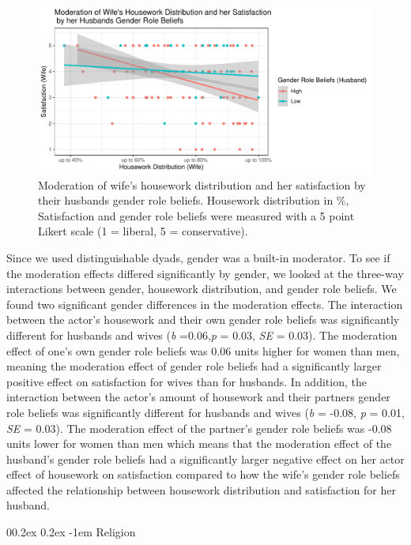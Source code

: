 \documentclass[
  man,floatsintext]{apa6}
\makeatletter
\let\oldparagraph\paragraph
\renewcommand{\paragraph}[1]{\oldparagraph{#1}\mbox{}}
\renewcommand{\paragraph}{\@startsection{paragraph}{4}{\parindent}%
  {0\baselineskip \@plus 0.2ex \@minus 0.2ex}%
  {-1em}%
  {\normalfont\normalsize\bfseries\itshape\typesectitle}}
\makeatother
\begin{document}
\begin{figure}
\centering
\includegraphics{Final_Paper_files/figure-latex/unnamed-chunk-58-1.pdf}
\caption{\label{fig:unnamed-chunk-58}Moderation of wife's housework distribution and her satisfaction by their husbands gender role beliefs. Housework distribution in \%, Satisfaction and gender role beliefs were measured with a 5 point Likert scale (1 = liberal, 5 = conservative).}
\end{figure}

Since we used distinguishable dyads, gender was a built-in moderator. To see if the moderation effects differed significantly by gender, we looked at the three-way interactions between gender, housework distribution, and gender role beliefs. We found two significant gender differences in the moderation effects. The interaction between the actor's housework and their own gender role beliefs was significantly different for husbands and wives (\emph{b} =0.06,\emph{p} = 0.03, \emph{SE} = 0.03). The moderation effect of one's own gender role beliefs was 0.06 units higher for women than men, meaning the moderation effect of gender role beliefs had a significantly larger positive effect on satisfaction for wives than for husbands.
In addition, the interaction between the actor's amount of housework and their partners gender role beliefs was significantly different for husbands and wives (\emph{b} = -0.08, \emph{p} = 0.01, \emph{SE} = 0.03). The moderation effect of the partner's gender role beliefs was -0.08 units lower for women than men which means that the moderation effect of the husband's gender role beliefs had a significantly larger negative effect on her actor effect of housework on satisfaction compared to how the wife's gender role beliefs affected the relationship between housework distribution and satisfaction for her husband.

\hypertarget{religion}{%
\paragraph{Religion}\label{religion}}
\end{document}
